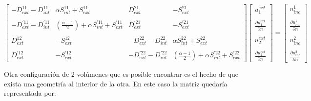 \documentclass[12pt,letterpaper]{article}
\numberwithin{equation}{section}
\begin{document}
\begin{equation} 
\begin{bmatrix}
-D_{ext}^{11} - D_{int}^{11} & \alpha S_{int}^{11} + S_{ext}^{11} & D_{ext}^{21} & -S_{ext}^{21} \\
\\
-D_{ext}^{'11} - D_{int}^{'11} & (\frac{\alpha - 1}{2})+\alpha S_{int}^{'11} + S_{ext}^{'11} & D_{ext}^{'21} & -S_{ext}^{'21}\\
\\
D_{ext}^{12} & -S_{ext}^{12} & -D_{ext}^{22} - D_{int}^{22} & \alpha S_{int}^{22} + S_{ext}^{22}\\
\\
D_{ext}^{'12} & -S_{ext}^{'12} & -D_{ext}^{'22} - D_{int}^{'22} & (\frac{\alpha - 1}{2})+\alpha S_{int}^{'22} + S_{ext}^{'22}
\end{bmatrix}
\begin{bmatrix}
u^{ext}_1\\
\\
\frac{\partial u^{ext}_1}{\partial n}\\
\\
u^{ext}_2\\
\\
\frac{\partial u^{ext}_2}{\partial n}
\end{bmatrix}
=
\begin{bmatrix}
u_{inc}^1\\
\\
\frac{\partial u_{inc}^1}{\partial n}\\
\\
u_{inc}^2\\
\\
\frac{\partial u_{inc}^2}{\partial n}
\end{bmatrix}
\label{eq:multi2_matriz ext}		 
\end{equation} 

Otra configuración de 2 volúmenes que es posible encontrar es el hecho de que exista una geometría al interior de la otra. En este caso la matriz quedaría representada por:
\end{document}
